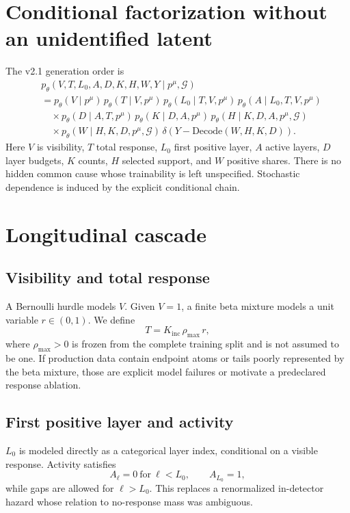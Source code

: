 \documentclass[10pt,a4paper]{article}
\newcommand{\pFour}{p^{\mu}}
\newcommand{\Kinc}{K_{\mathrm{inc}}}
\begin{document}
\section{Conditional factorization without an unidentified latent}

The v2.1 generation order is
\begin{align}
&p_\theta(V,T,L_0,A,D,K,H,W,Y\mid \pFour,\mathcal G)\\
&=p_\theta(V\mid \pFour)\,
  p_\theta(T\mid V,\pFour)\,
  p_\theta(L_0\mid T,V,\pFour)\,
  p_\theta(A\mid L_0,T,V,\pFour)\nonumber\\
&\quad\times p_\theta(D\mid A,T,\pFour)\,
  p_\theta(K\mid D,A,\pFour)\,
  p_\theta(H\mid K,D,A,\pFour,\mathcal G)\nonumber\\
&\quad\times p_\theta(W\mid H,K,D,\pFour,\mathcal G)\,
  \delta\!\left(Y-\mathrm{Decode}(W,H,K,D)\right).
\label{eq:factorization}
\end{align}
Here $V$ is visibility, $T$ total response, $L_0$ first positive layer, $A$ active layers, $D$ layer budgets, $K$ counts, $H$ selected support, and $W$ positive shares. There is no hidden common cause whose trainability is left unspecified. Stochastic dependence is induced by the explicit conditional chain.

\section{Longitudinal cascade}

\subsection{Visibility and total response}
A Bernoulli hurdle models $V$. Given $V=1$, a finite beta mixture models a unit variable $r\in(0,1)$. We define
\begin{equation}
 T=\Kinc\,\rho_{\max}\,r,
 \label{eq:response}
\end{equation}
where $\rho_{\max}>0$ is frozen from the complete training split and is not assumed to be one. If production data contain endpoint atoms or tails poorly represented by the beta mixture, those are explicit model failures or motivate a predeclared response ablation.

\subsection{First positive layer and activity}
$L_0$ is modeled directly as a categorical layer index, conditional on a visible response. Activity satisfies
\begin{equation}
 A_\ell=0\ \text{for}\ \ell<L_0,\qquad A_{L_0}=1,
\end{equation}
while gaps are allowed for $\ell>L_0$. This replaces a renormalized in-detector hazard whose relation to no-response mass was ambiguous.
\end{document}
